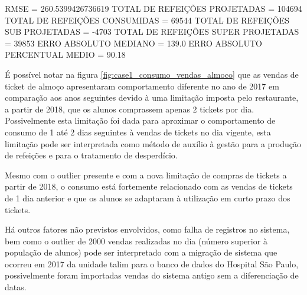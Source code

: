 \documentclass[	12pt, Times, openright, twoside, a4paper, english, brazil]{abntex2}
\begin{document}
                    RMSE = 260.5399426736619\newline
                    TOTAL DE REFEIÇÕES PROJETADAS = 104694\newline 
                    TOTAL DE REFEIÇÕES CONSUMIDAS = 69544\newline
                    TOTAL DE REFEIÇÕES SUB PROJETADAS = -4703\newline 
                    TOTAL DE REFEIÇÕES SUPER PROJETADAS = 39853\newline 
                    ERRO ABSOLUTO MEDIANO = 139.0\newline 
                    ERRO ABSOLUTO PERCENTUAL MEDIO = 90.18%
                    
        	       É possível notar na figura \ref{fig:case1_consumo_vendas_almoco} que as  vendas de ticket de almoço apresentaram comportamento diferente no ano de 2017 em comparação aos anos seguintes devido à uma limitação imposta pelo restaurante, a partir de 2018, que os alunos comprassem apenas 2 tickets por dia. Possivelmente esta limitação foi dada para aproximar o comportamento de consumo de 1 até 2 dias seguintes à vendas de tickets no dia vigente, esta limitação pode ser interpretada como método de auxílio à gestão para a produção de refeições e para o tratamento de desperdício.
        	        
        	        Mesmo com o outlier presente e com a nova limitação de compras de tickets a partir de 2018, o consumo está fortemente relacionado com as vendas de tickets de 1 dia anterior e que os alunos se adaptaram à utilização em curto prazo dos tickets.
        	        
        	        Há outros fatores não previstos envolvidos, como falha de registros no sistema, bem como o outlier de 2000 vendas realizadas no dia (número superior à população de alunos) pode ser interpretado com a migração de sistema que ocorreu em 2017 da unidade talim para o banco de dados do Hospital São Paulo, possivelmente foram importadas vendas do sistema antigo sem a diferenciação de datas.
        	        
\end{document}
